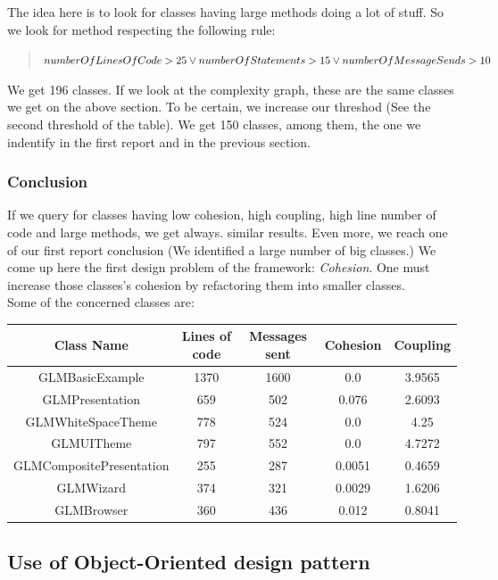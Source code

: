 \documentclass[11pt,a4paper]{article}
\begin{document}
The idea here is to look for classes having large methods doing a lot of stuff. So we look for method respecting the following rule:

\begin{quote} $ numberOfLinesOfCode > 25 \\ \vee numberOfStatements > 15 \\ \vee numberOfMessageSends > 10$\\\end{quote}

We get 196 classes. If we look at the complexity graph, these are the same classes we get on the above section. To be certain, we increase our threshod (See the second threshold of the table). We get 150 classes, among them, the one we indentify in the first report and in the previous section. 
\subsubsection{Conclusion}
If we query for classes having low cohesion, high coupling, high line number of code and large methods, we get always. similar results. Even more, we reach one of our first report conclusion (We identified a large number of big classes.) We come up here the first design problem of the framework: \emph{Cohesion}. One must increase those classes's cohesion by refactoring them into smaller classes.\\

Some of the concerned classes are:\\ 

\begin{tabular}{| c | c | c | c | c |}
\hline 
Class Name & Lines of code & Messages sent & Cohesion & Coupling\\
\hline
GLMBasicExample & 1370 & 1600 & 0.0 & 3.9565\\
\hline
GLMPresentation & 659 & 502 & 0.076 & 2.6093\\
\hline
GLMWhiteSpaceTheme & 778 & 524 & 0.0 & 4.25 \\
\hline
GLMUITheme & 797 & 552 & 0.0 & 4.7272\\
\hline
GLMCompositePresentation & 255 & 287 & 0.0051 & 0.4659\\
\hline 
GLMWizard &  374 & 321 & 0.0029 & 1.6206\\
\hline
GLMBrowser & 360 & 436 & 0.012 & 0.8041\\
\hline
\end{tabular}
\subsection{Use of Object-Oriented design pattern}
\end{document}
